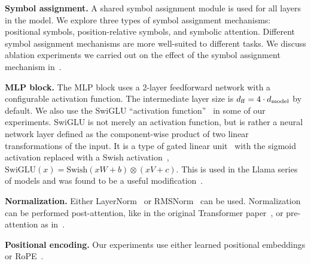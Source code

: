 






\textbf{Symbol assignment.} A shared symbol assignment module is used for all layers in the model. We explore three types of symbol assignment mechanisms: positional symbols, position-relative symbols, and symbolic attention. Different symbol assignment mechanisms are more well-suited to different tasks. We discuss ablation experiments we carried out on the effect of the symbol assignment mechanism in~.

\textbf{MLP block.} The MLP block uses a 2-layer feedforward network with a configurable activation function. The intermediate layer size is $d_{\mathrm{ff}} = 4 \cdot d_{\mathrm{model}}$ by default. We also use the SwiGLU ``activation function''~\citep{shazeerGLUVariantsImprove2020} in some of our experiments. SwiGLU is not merely an activation function, but is rather a neural network layer defined as the component-wise product of two linear transformations of the input. It is a type of gated linear unit~\citep{dauphin2017language} with the sigmoid activation replaced with a Swish activation~\citep{hendrycks2016gaussian}, $\mathrm{SwiGLU}(x) = \mathrm{Swish}(x W + b) \otimes (x V + c)$. This is used in the Llama series of models and was found to be a useful modification~\citep{touvronLlamaOpenFoundation2023}.

\textbf{Normalization.} Either LayerNorm~\citep{ba2016layer} or RMSNorm~\citep{zhang2019root} can be used. Normalization can be performed post-attention, like in the original Transformer paper~\citep{vaswani2017attention}, or pre-attention as in~\citep{xiong2020layer}.

\textbf{Positional encoding.} Our experiments use either learned positional embeddings or RoPE~\citep{suRoFormerEnhancedTransformer2023}.

